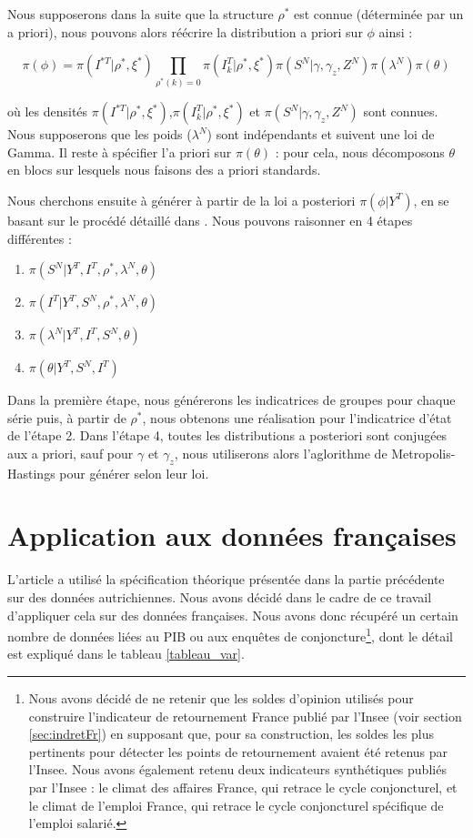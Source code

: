 \documentclass[10pt,french,french]{article}
\let\rmarkdownfootnote\footnote%
\def\footnote{\protect\rmarkdownfootnote}
\begin{document}
Nous supposerons dans la suite que la structure \(\rho^*\) est connue (déterminée par un a priori), nous pouvons alors réécrire la distribution a priori sur \(\phi\) ainsi :

\[\pi(\phi) = \pi(I^{*T}|\rho^*, \xi^*) \prod \limits_{\rho^*(k)=0} \pi(I^{T}_k|\rho^*,\xi^*)\pi(S^N|\gamma, \gamma_z,Z^N)\pi(\lambda^N)\pi(\theta)\]

où les densités \(\pi(I^{*T}|\rho^*, \xi^*)\),\(\pi(I^{T}_k|\rho^*,\xi^*)\) et \(\pi(S^N|\gamma, \gamma_z,Z^N)\) sont connues.
Nous supposerons que les poids (\(\lambda^N\)) sont indépendants et suivent une loi de Gamma.
Il reste à spécifier l'a priori sur \(\pi(\theta)\) : pour cela, nous décomposons \(\theta\) en blocs sur lesquels nous faisons des a priori standards.

Nous cherchons ensuite à générer à partir de la loi a posteriori \(\pi(\phi|Y^T)\), en se basant sur le procédé détaillé dans \cite{FruhwirthKaufmann}.
Nous pouvons raisonner en 4 étapes différentes :

\begin{enumerate}
\def\labelenumi{\arabic{enumi}.}
\item
  \(\pi(S^N|Y^T, I^T, \rho^*, \lambda^N, \theta)\)
\item
  \(\pi(I^T|Y^T, S^N, \rho^*, \lambda^N, \theta)\)
\item
  \(\pi(\lambda^N|Y^T, I^T, S^N, \theta)\)
\item
  \(\pi(\theta|Y^T,S^N,I^T)\)
\end{enumerate}

Dans la première étape, nous générerons les indicatrices de groupes pour chaque série puis, à partir de \(\rho^*\), nous obtenons une réalisation pour l'indicatrice d'état de l'étape 2.
Dans l'étape 4, toutes les distributions a posteriori sont conjugées aux a priori, sauf pour \(\gamma\) et \(\gamma_z\), nous utiliserons alors l'aglorithme de Metropolis-Hastings pour générer selon leur loi.

\hypertarget{application-aux-donnuxe9es-franuxe7aises}{%
\section{Application aux données françaises}\label{application-aux-donnuxe9es-franuxe7aises}}

L'article \cite{Kaufmann} a utilisé la spécification théorique présentée dans la partie précédente sur des données autrichiennes.
Nous avons décidé dans le cadre de ce travail d'appliquer cela sur des données françaises.
Nous avons donc récupéré un certain nombre de données liées au PIB ou aux enquêtes de conjoncture\footnote{Nous avons décidé de ne retenir que les soldes d'opinion utilisés pour construire l'indicateur de retournement France publié par l'Insee (voir section \ref{sec:indretFr}) en supposant que, pour sa construction, les soldes les plus pertinents pour détecter les points de retournement avaient été retenus par l'Insee.
  Nous avons également retenu deux indicateurs synthétiques publiés par l'Insee : le climat des affaires France, qui retrace le cycle conjoncturel, et le climat de l'emploi France, qui retrace le cycle conjoncturel spécifique de l'emploi salarié.}, dont le détail est expliqué dans le tableau \ref{tableau_var}.
\end{document}

